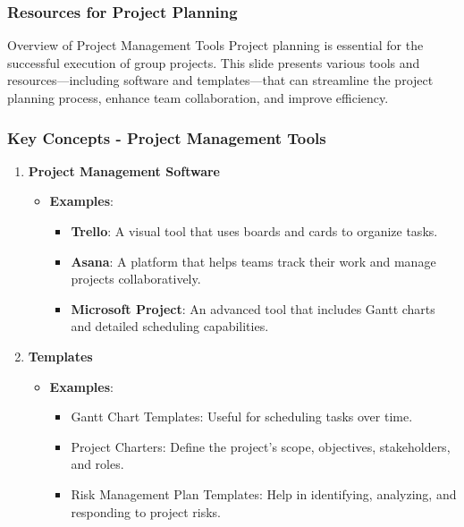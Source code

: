 \documentclass[aspectratio=169]{beamer}
\begin{document}
\begin{frame}[fragile]
    \frametitle{Resources for Project Planning}
    \begin{block}{Overview of Project Management Tools}
        Project planning is essential for the successful execution of group projects. This slide presents various tools and resources—including software and templates—that can streamline the project planning process, enhance team collaboration, and improve efficiency.
    \end{block}
\end{frame}

\begin{frame}[fragile]
    \frametitle{Key Concepts - Project Management Tools}
    \begin{enumerate}
        \item \textbf{Project Management Software}
            \begin{itemize}
                \item \textbf{Examples}:
                    \begin{itemize}
                        \item \textbf{Trello}: A visual tool that uses boards and cards to organize tasks.
                        \item \textbf{Asana}: A platform that helps teams track their work and manage projects collaboratively.
                        \item \textbf{Microsoft Project}: An advanced tool that includes Gantt charts and detailed scheduling capabilities.
                    \end{itemize}
            \end{itemize}
        
        \item \textbf{Templates}
            \begin{itemize}
                \item \textbf{Examples}:
                    \begin{itemize}
                        \item Gantt Chart Templates: Useful for scheduling tasks over time.
                        \item Project Charters: Define the project's scope, objectives, stakeholders, and roles.
                        \item Risk Management Plan Templates: Help in identifying, analyzing, and responding to project risks.
                    \end{itemize}
            \end{itemize}
        

\end{enumerate}
\end{frame}
\end{document}
